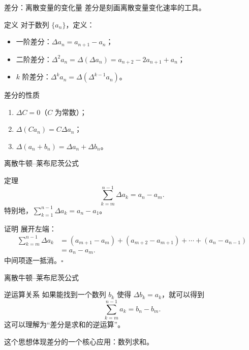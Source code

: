 \documentclass[aspectratio=169,10pt]{ctexbeamer}
\newcommand{\qedhereppt}{\hfill$\square$}
\begin{document}
\begin{frame}{差分：离散变量的变化量}
  \small
  差分是刻画离散变量变化速率的工具。
  \begin{block}{定义}
    对于数列 \(\{a_n\}\)，定义：
    \begin{itemize}
    	\item 一阶差分：\(\Delta a_n = a_{n+1} - a_n\)；
    	\item 二阶差分：\(\Delta^2 a_n = \Delta(\Delta a_n) = a_{n+2} - 2a_{n+1} + a_n\)；
    	\item \(k\) 阶差分：\(\Delta^k a_n = \Delta(\Delta^{k-1} a_n)\)。
    \end{itemize}
  \end{block}
 
 \begin{block}{差分的性质}
 	\begin{enumerate}
 		\item \(\Delta C = 0\)（\(C\) 为常数）；
 		\item \(\Delta(C a_n) = C \Delta a_n\)；
 		\item \(\Delta(a_n + b_n) = \Delta a_n + \Delta b_n\)。
 	\end{enumerate}
 \end{block}
 
 
\end{frame}





\begin{frame}{离散牛顿--莱布尼茨公式}

  \small
  \begin{block}{定理}
    \[
    \sum _{k=m}^{n-1} \Delta a_k = a_n - a_m.
    \]
    特别地，\(\sum_{k=1}^{n-1} \Delta a_k = a_n - a_1\)。
  \end{block}
  \begin{block}{证明}
  	展开左端：
  	\begin{align*}
  		\sum_{k=m}^{n-1}\Delta a_k
  		&=(a_{m+1}-a_m)+(a_{m+2}-a_{m+1})+\cdots+(a_n-a_{n-1})\\
  		&=a_n-a_m.
  	\end{align*}
  	中间项逐一抵消。\qedhereppt
  \end{block}
 
\end{frame}

\begin{frame}{离散牛顿--莱布尼茨公式}
  \small
   \begin{exampleblock}{逆运算关系}
  	如果能找到一个数列 \(b_k\) 使得 \(\Delta b_k=a_k\)，就可以得到
  	\[
  	\sum_{k=m}^{n-1}a_k=b_n-b_m.
  	\]
  	这可以理解为“差分是求和的逆运算”。
  \end{exampleblock}
  
  这个思想体现差分的一个核心应用：数列求和。

\end{frame}
\end{document}

